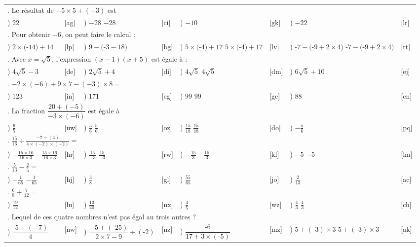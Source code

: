 \documentclass[
	classe=$2^{de}$,
	exercices=Exercices\space chapitre\space 1
]{exercice}
\newcounter{QCMQuestionCounter}
\newcounter{QCMReponseCounter}
\newcommand{\QCMQuestion}[1]{
	\hline\multicolumn{8}{l}{\arabic{QCMQuestionCounter}. #1}\stepcounter{QCMQuestionCounter} \\
}
\newcommand{\QCMReponse}[8]{
	\setcounter{QCMReponseCounter}{1}         \alph{QCMReponseCounter}) #1 & [#2] & \stepcounter{QCMReponseCounter}           \alph{QCMReponseCounter}) #3 & [#4] & \stepcounter{QCMReponseCounter}           \alph{QCMReponseCounter}) #5 & [#6] & \stepcounter{QCMReponseCounter}           \alph{QCMReponseCounter}) #7 & [#8] \\
}
\newcommand{\QCMJuste}[1]{
\ifdefined\makeCorrection
\uline{{\color{red}#1}}
\else
#1
\fi
}
\begin{document}
\begin{tabular}{llllllll}
	\QCMQuestion{Le résultat de $-5 × 5 + (-3)$ est}
	\QCMReponse{$22$}{ag}{\QCMJuste{$-28$}}{ci}{$-10$}{gk}{$-22$}{lr}
	\QCMQuestion{Pour obtenir $-6$, on peut faire le calcul :}
	\QCMReponse{$2 × ($-$14) + 14$}{lp}{$9 - ($-$3 - 18)$}{bg}{\QCMJuste{$5 × ($-$4) + 17$}}{lv}{\QCMJuste{-$7 - ($-$9 + 2 × 4)$}}{rt}
	\QCMQuestion{Avec $x=\sqrt{5}$, l'expression $(x-1)(x+5)$ est égale à :}
	\QCMReponse{$4\sqrt{5} - 3$}{de}{$2\sqrt{5} + 4$}{di}{\QCMJuste{$4\sqrt{5}$}}{dm}{$6\sqrt{5} + 10$}{ej}
	\QCMQuestion{$-2 × (-6) + 9 × 7 - (-3) × 8 =$}
	\QCMReponse{$123$}{in}{$171$}{cg}{\QCMJuste{$99$}}{gc}{$88$}{cn}
	\QCMQuestion{La fraction $\dfrac{20 + (-5)}{-3 × (-6)}$ est égale à}
	\QCMReponse{$\frac{6}{5}$}{uw}{\QCMJuste{$\frac{5}{6}$}}{oz}{\QCMJuste{$\frac{15}{18}$}}{do}{$-\frac{5}{6}$}{pq}
	\QCMQuestion{$\frac{15}{16} ÷ \frac{-7 + (4)}{4 × (-2) × (-2)} =$}
	\QCMReponse{\QCMJuste{$-\frac{15 × 16}{16 × 3}$}}{hr}{\QCMJuste{$\frac{15}{-3}$}}{rw}{\QCMJuste{$-\frac{15}{3}$}}{kl}{\QCMJuste{$-5$}}{lm}
	\QCMQuestion{$\frac{5}{13}-\frac{2}{5} =$}
	\QCMReponse{\QCMJuste{$-\frac{1}{65}$}}{hj}{$\frac{3}{8}$}{gl}{$\frac{55}{65}$}{jo}{$\frac{2}{13}$}{ac}
	\QCMQuestion{$\frac{6}{8} + \frac{7}{12} =$}
	\QCMReponse{$\frac{19}{12}$}{lu}{$\frac{13}{20}$}{nx}{$\frac{4}{5}$}{wz}{\QCMJuste{$\frac{4}{3}$}}{ch}
	\QCMQuestion{Lequel de ces quatre nombres n'est pas égal au trois autres ?}
	\QCMReponse{$\dfrac{\text{-}5 + (-7)}{4}$}{nw}{$\dfrac{-5 + (\text{-}25)}{2 × 7 - 9} ÷ (\text{-}2)$}{nz}{$\dfrac{\text{-}6}{17 + 3 × (\text{-}5)}$}{mz}{\QCMJuste{$5 + (\text{-}3) × 3$}}{ak}
\end{tabular}
\end{document}
